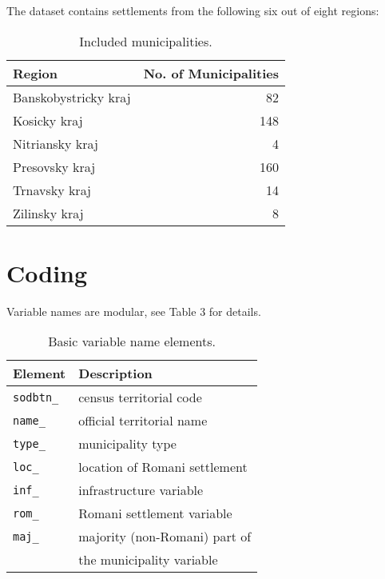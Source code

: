 \documentclass[11pt, a4paper]{article}
\begin{document}
The dataset contains settlements from the following
six out of eight regions:

\begin{table}[H]
	\label{tab:regions}
	\caption{Included municipalities.}
	\begin{center}
		\begin{tabular}{l r}
			\toprule
				Region & No. of Municipalities \\ 
			\midrule
		Banskobystricky kraj&   82	\\
        		Kosicky kraj&  148  \\	
		     Nitriansky kraj&    4  \\
      		  Presovsky kraj&  160  \\
               Trnavsky kraj&   14  \\
               Zilinsky kraj&    8  \\
			\bottomrule
		\end{tabular}
	\end{center}
\end{table}




\section{Coding}

Variable names are modular, see Table 3 for details.

\begin{table}[H]
	\label{tab:modules}
	\caption{Basic variable name elements.}
	\begin{center}
		\begin{tabular}{ll}
			\toprule
			Element	& Description \\		
			\midrule
				\texttt{sodbtn\_}	&	census territorial code 		\\
				\texttt{name\_}		&	official territorial name 		\\
				\texttt{type\_}		&	municipality type				\\
				\texttt{loc\_}		&	location of Romani settlement	\\	
				\texttt{inf\_}		&	infrastructure variable			\\
				\texttt{rom\_}		&	Romani settlement variable		\\
				\texttt{maj\_}		&	majority (non-Romani) part of 	\\
									&	the municipality variable		\\
			\bottomrule
		\end{tabular}
	\end{center}
\end{table}
\end{document}
